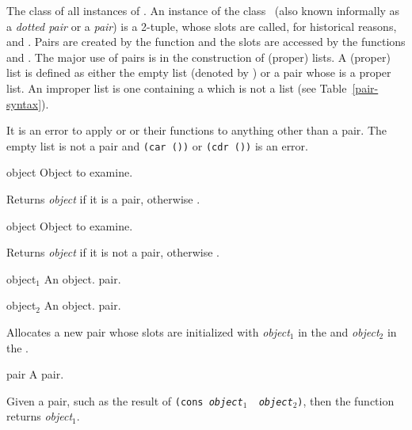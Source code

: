 \begin{optDefinition}

The class of all instances of .  An instance of the class
\ (also known informally as a {\em dotted pair\/} or a {\em
    pair\/}) is a 2-tuple, whose slots are called, for historical reasons,
 and .  Pairs are created by the function
 and the slots are accessed by the functions 
and .  The major use of pairs is in the construction of
(proper) lists.  A (proper) list is defined as either the
empty list (denoted by \nil) or a pair whose  is a proper list.
An improper list is one containing a  which is not a list (see
Table~\ref{pair-syntax}).

It is an error to apply  or  or their
 functions to anything other than a pair.  The empty list is
not a pair and {\tt (car ())} or {\tt (cdr ())} is an error.

%
\begin{arguments}
    \item[object] Object to examine.
\end{arguments}
%
\result%
Returns {\em object\/} if it is a pair, otherwise \nil.

%
\begin{arguments}
    \item[object] Object to examine.
\end{arguments}
%
\result%
Returns {\em object\/} if it is not a pair, otherwise \nil.

%
\begin{arguments}
    \item[object$_1$] An object.  pair.
    \item[object$_2$] An object.  pair.
\end{arguments}
%
\result%
Allocates a new pair whose slots are initialized with {\em object$_1$} in the
 and {\em object$_2$} in the .

%
\begin{arguments}
    \item[pair] A pair.
\end{arguments}
%
\result%
Given a pair, such as the result of {\tt (cons {\em object$_1$} {\em
        object$_2$})}, then the function  returns {\em
    object$_1$}.


\end{optDefinition}
